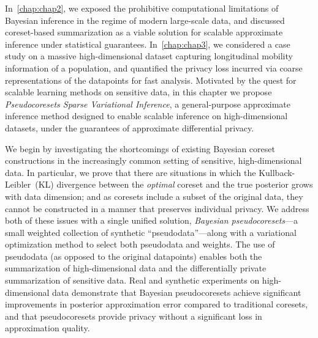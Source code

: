 In~\cref{chap:chap2}, we exposed the prohibitive computational limitations of Bayesian inference in the regime of modern large-scale data, and discussed coreset-based summarization as a viable solution for scalable approximate inference under statistical guarantees. In~\cref{chap:chap3}, we considered a case study on a massive high-dimensional dataset capturing longitudinal mobility information of a population, and quantified the privacy loss incurred via coarse representations of the datapoints for fast analysis.
Motivated by the quest for scalable learning methods on sensitive data, in this chapter we propose \emph{Pseudocoresets Sparse Variational Inference}, a general-purpose approximate inference method designed to enable scalable inference on high-dimensional datasets, under the guarantees of approximate differential privacy.

We begin by investigating the shortcomings of existing Bayesian coreset constructions 
in the increasingly common setting of sensitive, high-dimensional data. 
In particular, we prove that there are situations in which 
the Kullback-Leibler~(KL) divergence between the \emph{optimal} coreset 
and the true posterior grows with data dimension; and as coresets include
a subset of the original data, they cannot be constructed in a manner
that preserves individual privacy.
We address both of these issues with a single unified solution, \emph{Bayesian
pseudocoresets}---a small weighted collection of synthetic
``pseudodata''---along with a variational optimization method to select both
pseudodata and weights.  The use of pseudodata (as opposed to
the original datapoints) enables both the summarization of high-dimensional data
and the  differentially private summarization of
sensitive data. Real and
synthetic experiments on high-dimensional data demonstrate that Bayesian 
pseudocoresets achieve significant improvements in posterior approximation error compared to
traditional coresets, and that pseudocoresets provide privacy without
a significant loss in approximation quality. 


